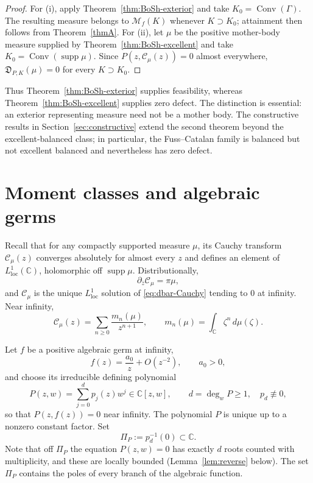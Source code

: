 \documentclass[reqno]{amsart}
\theoremstyle{definition}
\theoremstyle{remark}
\newcommand{\bC}{\mathbb C}
\newcommand{\M}{\mathcal M}
\newcommand{\Cauchy}{\mathcal C}
\newcommand{\supp}{\operatorname{supp}}
\newcommand{\Conv}{\operatorname{Conv}}
\begin{document}
\begin{proof}
For \textup{(i)}, apply Theorem~\ref{thm:BoSh-exterior} and take
$K_0=\Conv(\Gamma)$.  The resulting measure belongs to $\M_f(K)$ whenever
$K\supset K_0$; attainment then follows from Theorem~\ref{thmA}.  For
\textup{(ii)}, let $\mu$ be the positive mother-body measure supplied by
Theorem~\ref{thm:BoSh-excellent} and take
$K_0=\Conv(\supp\mu)$.  Since
$P(z,\Cauchy_\mu(z))=0$ almost everywhere, $\mathfrak D_{P,K}(\mu)=0$ for every
$K\supset K_0$.
\end{proof}

Thus Theorem~\ref{thm:BoSh-exterior} supplies feasibility, whereas
Theorem~\ref{thm:BoSh-excellent} supplies zero defect.  The distinction is
essential: an exterior representing measure need not be a mother body.  The
constructive results in Section~\ref{sec:constructive} extend the second theorem
beyond the excellent-balanced class; in particular, the Fuss--Catalan family is
balanced but not excellent balanced and nevertheless has zero defect.

\section{Moment classes and algebraic germs}\label{sec:moment}

Recall that for any compactly supported measure $\mu$, its Cauchy transform $\Cauchy_\mu(z)$ converges absolutely for almost every $z$ and defines an element of
$L^1_{\mathrm{loc}}(\bC)$, holomorphic off $\supp\mu$.  Distributionally,
\begin{equation}\label{eq:dbar-Cauchy}
 \partial_{\bar z}\Cauchy_\mu=\pi\mu ,
\end{equation}
and $\Cauchy_\mu$ is the unique $L^1_{\mathrm{loc}}$ solution of
\eqref{eq:dbar-Cauchy} tending to $0$ at infinity.  Near infinity,
\[
 \Cauchy_\mu(z)=\sum_{n\geq 0}\frac{m_n(\mu)}{z^{n+1}},
 \qquad
 m_n(\mu)=\int_{\bC}\zeta^n\,d\mu(\zeta).
\]

Let $f$ be a positive algebraic germ at infinity,
\[
 f(z)=\frac{a_0}{z}+O(z^{-2}),\qquad a_0>0,
\]
and choose its irreducible defining polynomial
\begin{equation}\label{eq:minimal-polynomial}
 P(z,w)=\sum_{j=0}^{d}p_j(z)w^j\in\bC[z,w],
 \qquad d=\deg_wP\geq 1,\quad p_d\not\equiv0,
\end{equation}
so that $P(z,f(z))=0$ near infinity.  The polynomial $P$ is unique up to a
nonzero constant factor.  Set 
\begin{equation}\label{eq:polar-set}
 \Pi_P:=p_d^{-1}(0)\subset\bC.
\end{equation}
Note that  off $\Pi_P$ the equation $P(z,w)=0$ has exactly $d$ roots counted
with multiplicity, and these are locally bounded (Lemma~\ref{lem:reverse}
below).  The set $\Pi_P$ contains the poles of every branch of the algebraic
function.
\end{document}

